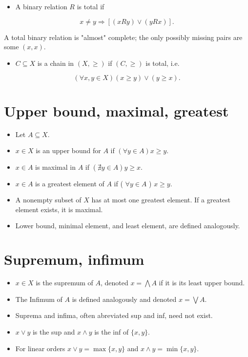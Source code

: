 \documentclass[10pt]{article}
\begin{document}
\begin{itemize}
  \item A binary relation $R$ is total if
\end{itemize}

$$
x \neq y \Longrightarrow[(x R y) \vee(y R x)] .
$$

A total binary relation is "almost" complete; the only possibly missing pairs are some $(x, x)$.

\begin{itemize}
  \item $C \subseteq X$ is a chain in $(X, \geq)$ if $(C, \geq)$ is total, i.e.
\end{itemize}

$$
(\forall x, y \in X)(x \geq y) \vee(y \geq x) .
$$

\section*{Upper bound, maximal, greatest}
\begin{itemize}
  \item Let $A \subseteq X$.
  \item $x \in X$ is an upper bound for $A$ if $(\forall y \in A) x \geq y$.
  \item $x \in A$ is maximal in $A$ if $(\nexists y \in A) y \geq x$.
  \item $x \in A$ is a greatest element of $A$ if ( $\forall y \in A$ ) $x \geq y$.
  \item A nonempty subset of $X$ has at most one greatest element. If a greatest element exists, it is maximal.
  \item Lower bound, minimal element, and least element, are defined analogously.
\end{itemize}

\section*{Supremum, infimum}
\begin{itemize}
  \item $x \in X$ is the supremum of $A$, denoted $x=\bigwedge A$ if it is its least upper bound.
  \item The Infimum of $A$ is defined analogously and denoted $x=\bigvee A$.
  \item Suprema and infima, often abreviated sup and inf, need not exist.
  \item $x \vee y$ is the sup and $x \wedge y$ is the inf of $\{x, y\}$.
  \item For linear orders $x \vee y=\max \{x, y\}$ and $x \wedge y=\min \{x, y\}$.
\end{itemize}
\end{document}
